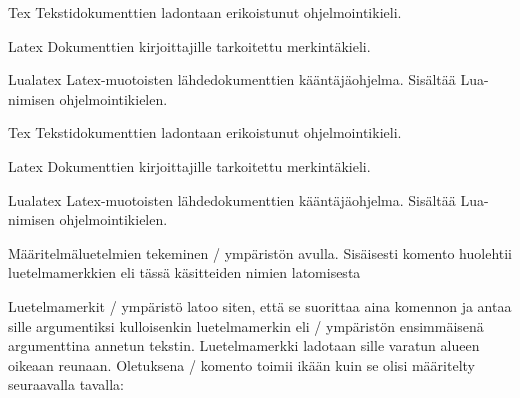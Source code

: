 \begin{esimerkki*}

\begin{koodilohko}
  \begin{list}{}{
      \renewcommand{\makelabel}[1]{\textsc{#1:}}
      \setlength{\leftmargin}{1.5em}
      \setlength{\labelwidth}{1.5em}
      \setlength{\itemindent}{1em}
      \setlength{\labelsep}{1em}
      \setlength{\itemsep}{.2ex}
    }
  \item[Tex] Tekstidokumenttien ladontaan erikoistunut ohjelmointikieli.
  \item[Latex] Dokumenttien kirjoittajille tarkoitettu merkintäkieli.
  \item[Lualatex] Latex-muotoisten lähdedokumenttien kääntäjäohjelma.
    Sisältää Lua-nimi\-sen ohjelmointikielen.
  \end{list}
\end{koodilohko}
\begin{tulos}
  \begin{list}{}{
      \renewcommand{\makelabel}[1]{\textsc{#1:}}
      \setlength{\leftmargin}{1.5em}
      \setlength{\labelwidth}{1.5em}
      \setlength{\itemindent}{1em}
      \setlength{\labelsep}{1em}
      \setlength{\itemsep}{.2ex}
    }
  \item[Tex] Tekstidokumenttien ladontaan erikoistunut ohjelmointikieli.
  \item[Latex] Dokumenttien kirjoittajille tarkoitettu merkintäkieli.
  \item[Lualatex] Latex-muotoisten lähdedokumenttien kääntäjäohjelma.
    Sisältää Lua-nimi\-sen ohjelmointikielen.
  \end{list}
\end{tulos}
\caption{Määritelmäluetelmien tekeminen \-/ ympäristön
  avulla. Sisäisesti komento  huolehtii
  luetelmamerkkien eli tässä käsitteiden nimien latomisesta}
\label{esim:list_makelabel}
\end{esimerkki*}

Luetelmamerkit \-/ ympäristö latoo siten, että se
suorittaa aina komennon  ja antaa sille argumentiksi
kulloisenkin luetelmamerkin eli \-/ ympäristön
ensimmäisenä argumenttina annetun tekstin. Luetelmamerkki ladotaan sille
varatun alueen oikeaan reunaan. Oletuksena \-/
komento toimii ikään kuin se olisi määritelty seuraavalla tavalla:

